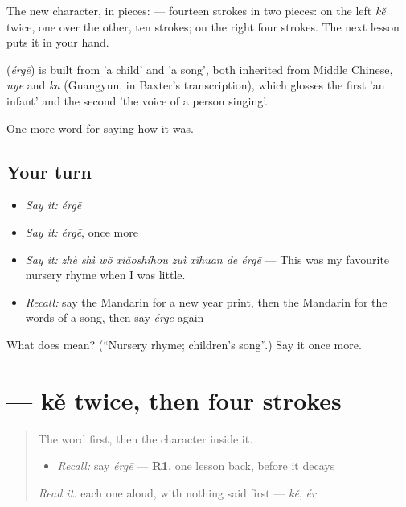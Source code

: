 The new character, in pieces:  — fourteen strokes in two pieces: on the left  \emph{kě} twice, one over the other, ten strokes; on the right four strokes. The next lesson puts it in your hand.

\begin{cousinweb}
\textbf{} (\emph{érgē}) is built from  'a child' and  'a song', both inherited from Middle Chinese, \emph{nye} and \emph{ka} (Guangyun, in Baxter's transcription), which glosses the first 'an infant' and the second 'the voice of a person singing'.
\end{cousinweb}

\begin{grammarlens}[title={What you've built}]
One more word for saying how it was.
\end{grammarlens}

\subsection*{Your turn}
\begin{itemize}
\raggedright
  \item \emph{Say it:} \emph{érgē}
  \item \emph{Say it:} \emph{érgē}, once more
  \item \emph{Say it:} \emph{zhè shì wǒ xiǎoshíhou zuì xǐhuan de érgē} — This was my favourite nursery rhyme when I was little.
  \item \emph{Recall:} say the Mandarin for a new year print, then the Mandarin for the words of a song, then say \emph{érgē} again
\end{itemize}

\begin{tcolorbox}[breakable,colback=teal!4,colframe=teal!35!black,title={Before you move on}]
What does  mean? (\textquotedblleft{}Nursery rhyme; children's song\textquotedblright{}.) Say it once more.
\end{tcolorbox}
\section[\texorpdfstring{\zh{歌} (gē)}{歌 (gē)}]{ — kě twice, then four strokes}

\label{lesson:ZH-W504-ge-song}



\begin{quote}
The word first, then the character inside it.

\begin{itemize}
\raggedright
  \item \emph{Recall:} say \emph{érgē} — \textbf{R1}, one lesson back, before it decays
\end{itemize}

\begin{quote}
 
\end{quote}

\emph{Read it:} each one aloud, with nothing said first — \emph{kě}, \emph{ér}
\end{quote}

